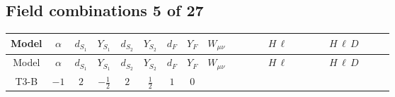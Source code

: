 \documentclass[8pt]{article}
\begin{document}
\begin{landscape}
\subsection*{Field combinations 5 of 27}
\begin{longtable}{@{}cccccccc >{\raggedright\arraybackslash}p{0.21\linewidth} >{\raggedright\arraybackslash}p{0.21\linewidth} >{\raggedright\arraybackslash}p{0.21\linewidth}@{}}
\toprule
Model & $\alpha$ & $d_{S_1}$ & $Y_{S_1}$ & $d_{S_2}$ & $Y_{S_2}$ & $d_F$ & $Y_F$ & $W_{\mu\nu}$ & $H\,\ell$ & $H\,\ell\,D$ \\
\midrule
\endfirsthead
\toprule
Model & $\alpha$ & $d_{S_1}$ & $Y_{S_1}$ & $d_{S_2}$ & $Y_{S_2}$ & $d_F$ & $Y_F$ & $W_{\mu\nu}$ & $H\,\ell$ & $H\,\ell\,D$ \\
\midrule
\endhead
T3-B & $-1$ & $2$ & $-\frac{1}{2}$ & $2$ & $\frac{1}{2}$ & $1$ & $0$ & \scriptsize\adjustbox{max width=\linewidth}{$\begin{gathered} -\frac{\hbar  \left(W_{\mu _1\mu _2}^{A_1}\right){}^2}{24 \epsilon } \\ -\frac{1}{24} \hbar  \log \left(\frac{\bar{\mu}^{2}}{m_1^2}\right) \left(W_{\mu _1\mu _2}^{A_1}\right){}^2 \\ +\frac{\hbar  \text{fStruct}(\text{SU2L})_{A_1,A_2,A_3} W_{\mu _1\mu _2}^{A_2} W_{\mu _1\mu _3}^{A_3} W_{\mu _2\mu _3}^{A_1}}{360 m_1^2}\end{gathered}$} & \scriptsize\adjustbox{max width=\linewidth}{$\begin{gathered} +\frac{2 \hbar  \overline{y_{1,i_1,r_1}} \overline{y_{2,i_2,r_1}} L_{a_4,i_2}{}^T\, C\, P_L\, L_{a_2,i_1} H_{a_1} H_{a_3} M_F \lambda_5 \epsilon_{a_1,a_2} \epsilon_{a_3,a_4}}{\sqrt{3} \epsilon  m_1^2} \\ +\frac{2 \hbar  \overline{y_{1,i_1,r_1}} \overline{y_{2,i_2,r_1}} L_{a_4,i_2}{}^T\, C\, P_L\, L_{a_2,i_1} H_{a_1} H_{a_3} M_F \lambda_5 \epsilon_{a_1,a_2} \epsilon_{a_3,a_4}}{\sqrt{3} m_1^2} \\ +\frac{2 \hbar  \log \left(\frac{\bar{\mu}^{2}}{m_1^2}\right) \overline{y_{1,i_1,r_1}} \overline{y_{2,i_2,r_1}} L_{a_4,i_2}{}^T\, C\, P_L\, L_{a_2,i_1} H_{a_1} H_{a_3} M_F \lambda_5 \epsilon_{a_1,a_2} \epsilon_{a_3,a_4}}{\sqrt{3} m_1^2}\end{gathered}$} & \scriptsize\adjustbox{max width=\linewidth}{$\begin{gathered} -\frac{i \hbar  \text{Delta}\left(i_1,i_2\right) \overline{L_{a_2,i_2}}\, \gamma ^{\mu _1}\, P_L\, L_{a_2,i_1} H_{a_1} D_{\mu _1}\left(H_{a_1}\right){}^{\dagger } g_2^4}{240 m_1^2} \\ +\frac{i \hbar  \text{Delta}\left(i_1,i_2\right) \overline{L_{a_2,i_2}}\, \gamma ^{\mu _1}\, P_L\, L_{a_1,i_1} H_{a_2} D_{\mu _1}\left(H_{a_1}\right){}^{\dagger } g_2^4}{120 m_1^2} \\ +\frac{i \hbar  \text{Delta}\left(i_1,i_2\right) \overline{L_{a_2,i_2}}\, \gamma ^{\mu _1}\, P_L\, L_{a_2,i_1} H_{a_1}{}^{\dagger } D_{\mu _1}\left(H_{a_1}\right) g_2^4}{240 m_1^2}\end{gathered}$} \\

\end{longtable}
\end{landscape}
\end{document}
